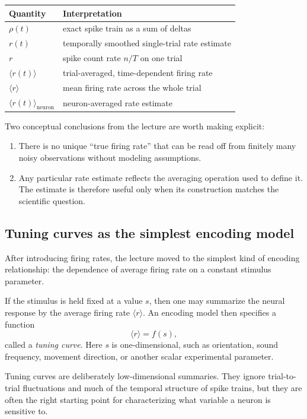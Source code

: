 \documentclass[11pt]{article}
\begin{document}
\begin{center}
\begin{tabular}{ll}
\toprule
Quantity & Interpretation \\
\midrule
$\rho(t)$ & exact spike train as a sum of deltas \\
$r(t)$ & temporally smoothed single-trial rate estimate \\
$r$ & spike count rate $n/T$ on one trial \\
$\langle r(t) \rangle$ & trial-averaged, time-dependent firing rate \\
$\langle r \rangle$ & mean firing rate across the whole trial \\
$\langle r(t) \rangle_{\mathrm{neuron}}$ & neuron-averaged rate estimate \\
\bottomrule
\end{tabular}
\end{center}

Two conceptual conclusions from the lecture are worth making explicit:
\begin{enumerate}
    \item There is no unique ``true firing rate'' that can be read off from finitely many noisy observations without modeling assumptions.
    \item Any particular rate estimate reflects the averaging operation used to define it. The estimate is therefore useful only when its construction matches the scientific question.
\end{enumerate}

\subsection{Tuning curves as the simplest encoding model}

After introducing firing rates, the lecture moved to the simplest kind of encoding relationship: the dependence of average firing rate on a constant stimulus parameter.

If the stimulus is held fixed at a value $s$, then one may summarize the neural response by the average firing rate $\langle r \rangle$. An encoding model then specifies a function
\[
\langle r \rangle = f(s),
\]
called a \emph{tuning curve}. Here $s$ is one-dimensional, such as orientation, sound frequency, movement direction, or another scalar experimental parameter.

Tuning curves are deliberately low-dimensional summaries. They ignore trial-to-trial fluctuations and much of the temporal structure of spike trains, but they are often the right starting point for characterizing what variable a neuron is sensitive to.
\end{document}
